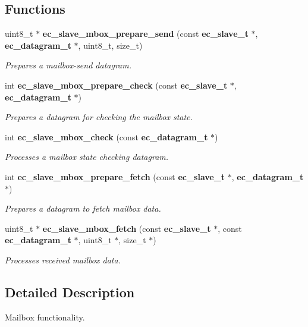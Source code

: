 \subsection*{\-Functions}
\begin{DoxyCompactItemize}
\item 
uint8\-\_\-t $\ast$ {\bf ec\-\_\-slave\-\_\-mbox\-\_\-prepare\-\_\-send} (const {\bf ec\-\_\-slave\-\_\-t} $\ast$, {\bf ec\-\_\-datagram\-\_\-t} $\ast$, uint8\-\_\-t, size\-\_\-t)
\begin{DoxyCompactList}\small\item\em \-Prepares a mailbox-\/send datagram. \end{DoxyCompactList}\item 
int {\bf ec\-\_\-slave\-\_\-mbox\-\_\-prepare\-\_\-check} (const {\bf ec\-\_\-slave\-\_\-t} $\ast$, {\bf ec\-\_\-datagram\-\_\-t} $\ast$)
\begin{DoxyCompactList}\small\item\em \-Prepares a datagram for checking the mailbox state. \end{DoxyCompactList}\item 
int {\bf ec\-\_\-slave\-\_\-mbox\-\_\-check} (const {\bf ec\-\_\-datagram\-\_\-t} $\ast$)
\begin{DoxyCompactList}\small\item\em \-Processes a mailbox state checking datagram. \end{DoxyCompactList}\item 
int {\bf ec\-\_\-slave\-\_\-mbox\-\_\-prepare\-\_\-fetch} (const {\bf ec\-\_\-slave\-\_\-t} $\ast$, {\bf ec\-\_\-datagram\-\_\-t} $\ast$)
\begin{DoxyCompactList}\small\item\em \-Prepares a datagram to fetch mailbox data. \end{DoxyCompactList}\item 
uint8\-\_\-t $\ast$ {\bf ec\-\_\-slave\-\_\-mbox\-\_\-fetch} (const {\bf ec\-\_\-slave\-\_\-t} $\ast$, const {\bf ec\-\_\-datagram\-\_\-t} $\ast$, uint8\-\_\-t $\ast$, size\-\_\-t $\ast$)
\begin{DoxyCompactList}\small\item\em \-Processes received mailbox data. \end{DoxyCompactList}\end{DoxyCompactItemize}


\subsection{\-Detailed \-Description}
\-Mailbox functionality. 

